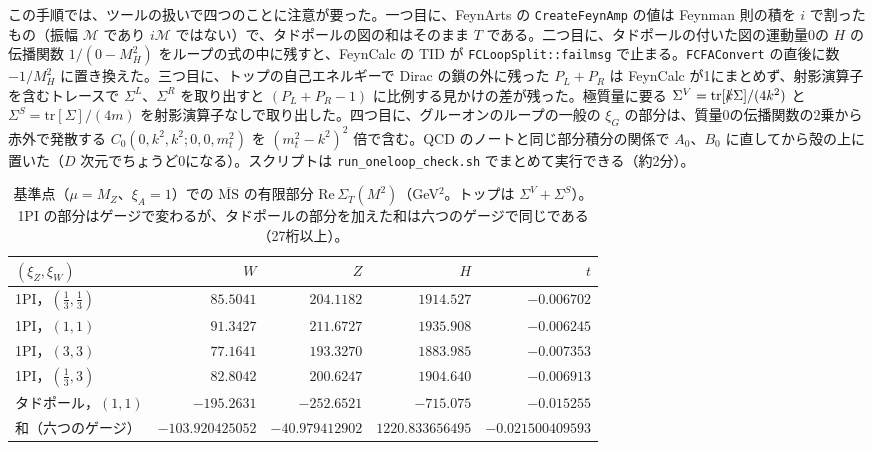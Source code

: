 \documentclass[a4paper,10pt]{ltjsarticle}
\newcommand{\MSbar}{\overline{\mathrm{MS}}}
\newcommand{\tr}{\mathrm{tr}}
\newcommand{\re}{\mathrm{Re}\,}
\begin{document}
この手順では、ツールの扱いで四つのことに注意が要った。一つ目に、FeynArts の \texttt{CreateFeynAmp} の値は Feynman 則の積を $i$ で割ったもの（振幅 $\mathcal M$ であり $i\mathcal M$ ではない）で、タドポールの図の和はそのまま $T$ である。二つ目に、タドポールの付いた図の運動量0の $H$ の伝播関数 $1/(0-M_H^2)$ をループの式の中に残すと、FeynCalc の TID が \texttt{FCLoopSplit::failmsg} で止まる。\texttt{FCFAConvert} の直後に数 $-1/M_H^2$ に置き換えた。三つ目に、トップの自己エネルギーで Dirac の鎖の外に残った $P_L+P_R$ は FeynCalc が1にまとめず、射影演算子を含むトレースで $\Sigma^L$、$\Sigma^R$ を取り出すと $(P_L+P_R-1)$ に比例する見かけの差が残った。極質量に要る $\Sigma^V=\tr[\slashed k\Sigma]/(4k^2)$ と $\Sigma^S=\tr[\Sigma]/(4m)$ を射影演算子なしで取り出した。四つ目に、グルーオンのループの一般の $\xi_G$ の部分は、質量0の伝播関数の2乗から赤外で発散する $C_0(0,k^2,k^2;0,0,m_t^2)$ を $(m_t^2-k^2)^2$ 倍で含む。QCD のノートと同じ部分積分の関係で $A_0$、$B_0$ に直してから殻の上に置いた（$D$ 次元でちょうど0になる）。スクリプトは \texttt{run\_oneloop\_check.sh} でまとめて実行できる（約2分）。

\begin{table}[tbp]
\centering\small
\caption{基準点（$\mu=M_Z$、$\xi_A=1$）での $\MSbar$ の有限部分 $\re\Sigma_T(M^2)$（GeV$^2$。トップは $\Sigma^V+\Sigma^S$）。1PI の部分はゲージで変わるが、タドポールの部分を加えた和は六つのゲージで同じである（27桁以上）。}
\label{tab:oneloopfin}
\begin{tabular}{lrrrr}
\toprule
$(\xi_Z,\xi_W)$ & $W$ & $Z$ & $H$ & $t$ \\
\midrule
1PI，$(\frac13,\frac13)$ & $85.5041$ & $204.1182$ & $1914.527$ & $-0.006702$ \\
1PI，$(1,1)$ & $91.3427$ & $211.6727$ & $1935.908$ & $-0.006245$ \\
1PI，$(3,3)$ & $77.1641$ & $193.3270$ & $1883.985$ & $-0.007353$ \\
1PI，$(\frac13,3)$ & $82.8042$ & $200.6247$ & $1904.640$ & $-0.006913$ \\
タドポール，$(1,1)$ & $-195.2631$ & $-252.6521$ & $-715.075$ & $-0.015255$ \\
和（六つのゲージ） & $-103.920425052$ & $-40.979412902$ & $1220.833656495$ & $-0.021500409593$ \\
\bottomrule
\end{tabular}
\end{table}
\end{document}
